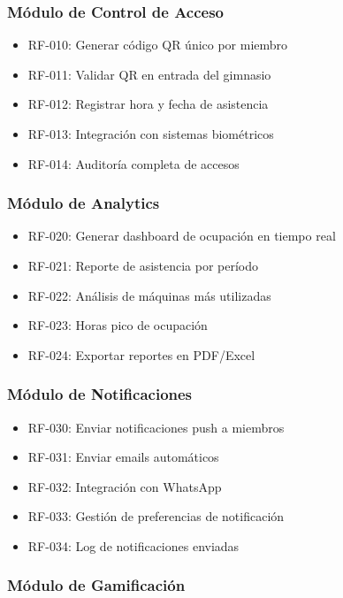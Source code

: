 \documentclass[11pt,a4paper]{article}
\begin{document}
\begin{itemize}
\subsubsection{Módulo de Control de Acceso}

\begin{itemize}
    \item RF-010: Generar código QR único por miembro
    \item RF-011: Validar QR en entrada del gimnasio
    \item RF-012: Registrar hora y fecha de asistencia
    \item RF-013: Integración con sistemas biométricos
    \item RF-014: Auditoría completa de accesos
\end{itemize}

\subsubsection{Módulo de Analytics}

\begin{itemize}
    \item RF-020: Generar dashboard de ocupación en tiempo real
    \item RF-021: Reporte de asistencia por período
    \item RF-022: Análisis de máquinas más utilizadas
    \item RF-023: Horas pico de ocupación
    \item RF-024: Exportar reportes en PDF/Excel
\end{itemize}

\subsubsection{Módulo de Notificaciones}

\begin{itemize}
    \item RF-030: Enviar notificaciones push a miembros
    \item RF-031: Enviar emails automáticos
    \item RF-032: Integración con WhatsApp
    \item RF-033: Gestión de preferencias de notificación
    \item RF-034: Log de notificaciones enviadas
\end{itemize}

\subsubsection{Módulo de Gamificación}


\end{itemize}
\end{document}
